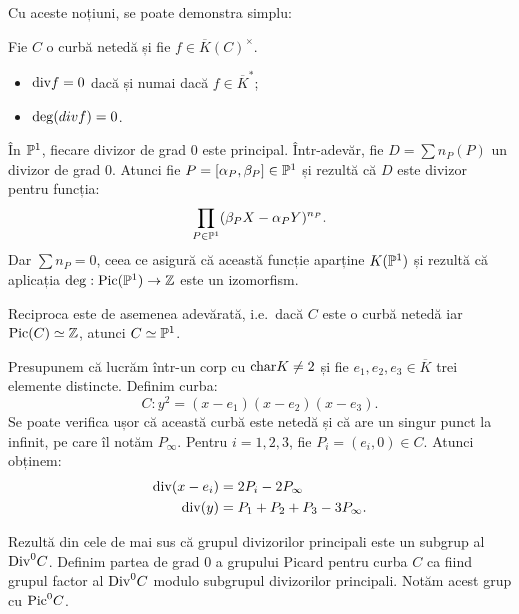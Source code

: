 Cu aceste noțiuni, se poate demonstra simplu:
\begin{proposition}\label{prop:deg-div}
    Fie $ C $ o curbă netedă și fie $ f \in \overline{K}(C)^\times $.
    \begin{itemize}
        \item $ \mathrm{div}f = 0 $ dacă și numai dacă $ f \in \overline{K}^\ast $;
        \item $ \mathrm{deg}(div f) = 0 $.
    \end{itemize}
\end{proposition}

\begin{example}\label{exm:div-princ}
    În $ \mathbb{P}^1 $, fiecare divizor de grad 0 este principal. Într-adevăr, fie
    $ D = \sum n_P(P) $ un divizor de grad 0. Atunci fie $ P = [\alpha_P, \beta_P] \in \mathbb{P}^1 $
    și rezultă că $ D $ este divizor pentru funcția:
    \[
        \prod_{P \in \mathbb{P}^1} (\beta_P X - \alpha_P Y)^{n_P}.
    \]
    Dar $ \sum n_P = 0 $, ceea ce asigură că această funcție aparține $ K(\mathbb{P}^1) $
    și rezultă că aplicația $ \mathrm{deg} : \mathrm{Pic}(\mathbb{P}^1) \to \mathbb{Z} $ este un izomorfism.

    Reciproca este de asemenea adevărată, i.e.\ dacă $ C $ este o curbă netedă
    iar $ \mathrm{Pic}(C) \simeq \mathbb{Z} $, atunci $ C \simeq \mathbb{P}^1 $.
\end{example}

\begin{example}\label{exm:div-princ2}
    Presupunem că lucrăm într-un corp cu $ \mathrm{char}K \neq 2 $ și fie 
    $ e_1, e_2, e_3 \in \overline{K} $ trei elemente distincte. Definim curba:
    \[
        C: y^2 = (x - e_1)(x - e_2)(x - e_3).
    \]
    Se poate verifica ușor că această curbă este netedă și că are un singur punct
    la infinit, pe care îl notăm $ P_\infty $. Pentru $ i = 1, 2, 3 $, fie $ P_i = (e_i, 0) \in C $.
    Atunci obținem:
    \begin{align*}
        \mathrm{div}(x - e_i) &= 2P_i - 2P_\infty \\
        \mathrm{div}(y) &= P_1 + P_2 + P_3 - 3P_\infty.
    \end{align*}
\end{example}

Rezultă din cele de mai sus că grupul divizorilor principali este un subgrup
al $ \mathrm{Div}^0 C $. Definim partea de grad 0 a grupului Picard pentru curba $ C $
ca fiind grupul factor al $ \mathrm{Div}^0 C $ modulo subgrupul divizorilor principali.
Notăm acest grup cu $ \mathrm{Pic}^0 C $. 

